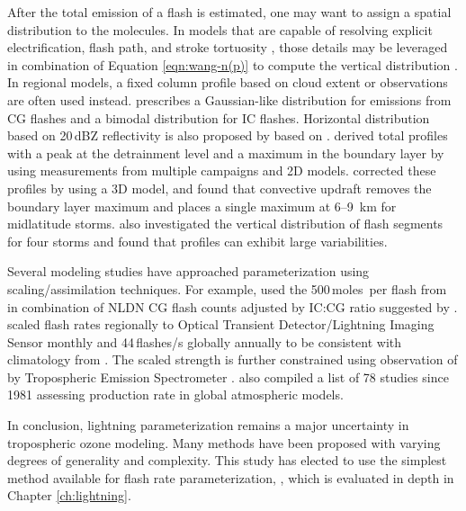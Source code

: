 	After the total emission of a flash is estimated, one may want to assign a spatial distribution to the molecules. In models that are capable of resolving explicit electrification, flash path, and stroke tortuosity \citep[e.g.][]{Mansell:2002kx}, those details may be leveraged in combination of Equation \ref{eqn:wang-n(p)} to compute the vertical distribution \citep{Barthe:2007fk}. In regional models, a fixed column profile based on cloud extent or observations are often used instead.  \citet{Decaria:2000kl} prescribes a Gaussian-like distribution for emissions from CG flashes and a bimodal distribution for IC flashes. Horizontal distribution based on 20\,\unit{dBZ} reflectivity is also proposed by \citet{DeCaria:2005tg} based on \citet{MacGorman:1998fk}. \citet{Pickering:1998sh} derived total {\lnox} profiles with a peak at the detrainment level and a maximum in the boundary layer by using measurements from multiple campaigns and 2D models. \citet{Ott:2010lo} corrected these profiles by using a 3D model, and found that convective updraft removes the boundary layer maximum and places a single maximum at 6--9 \,\unit{km} for midlatitude storms. \citet{Hansen:2010fk} also investigated the vertical distribution of flash segments for four storms and found that profiles can exhibit large variabilities.
	
	Several modeling studies have approached {\lnox} parameterization using scaling/assimilation techniques. For example, \citet{Hudman:2007fu} used the 500\,\unit{moles}\, per flash from \citet{Ott:2010lo} in combination of NLDN CG flash counts adjusted by IC:CG ratio suggested by \citet{Boccippio:2001ys}. \citet{Jourdain:2010tw} scaled flash rates regionally to Optical Transient Detector/Lightning Imaging Sensor \citep[OTD/LIS][]{Boccippio:2000mi} monthly and 44\,\unit{flashes/s} globally annually to be consistent with climatology from \citet{Christian:2003kx}. The scaled {\lnox} strength is further constrained using observation of  by Tropospheric Emission Spectrometer \citep[TES][]{Beer:2006fk}. \citet[][Table 24]{Schumann:2007fk} also compiled a list of 78 studies since 1981 assessing {\lnox} production rate in global atmospheric models.
	
\quad

\noindent In conclusion, lightning parameterization remains a major uncertainty in tropospheric ozone modeling. Many methods have been proposed with varying degrees of generality and complexity. This study has elected to use the simplest method available for flash rate parameterization, {\ie} \citet{Price:1992wb}, which is evaluated in depth in Chapter \ref{ch:lightning}.


